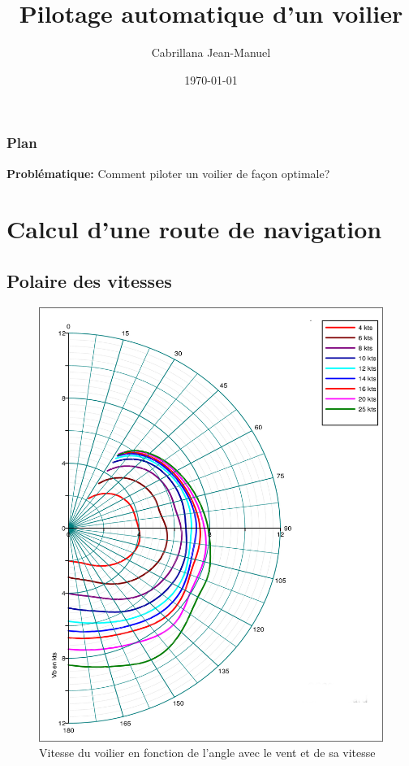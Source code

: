 \documentclass{beamer}
\begin{document}
\title{Pilotage automatique d'un voilier}  
\author{Cabrillana Jean-Manuel}
\date{\today} 

\begin{frame}
\titlepage
\end{frame}

\begin{frame}
\frametitle{Plan}
\textbf{Problématique:} Comment piloter un voilier de façon optimale?
\tableofcontents
\end{frame} 


\section{Calcul d'une route de navigation}
 
\subsection{Polaire des vitesses}

\begin{frame}
\begin{figure}
\includegraphics[scale=0.4]{polaire.jpg} 
\caption{Vitesse du voilier en fonction de l'angle avec le vent et de sa vitesse}
\end{figure}
\end{frame}
\end{document}

